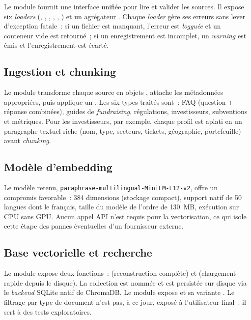 Le module  fournit une interface unifiée pour lire et valider les sources. Il expose six \textit{loaders} (, , , , , ) et un agrégateur . Chaque \textit{loader} gère ses erreurs sans lever d'exception fatale~: si un fichier est manquant, l'erreur est \textit{logguée} et un conteneur vide est retourné~; si un enregistrement est incomplet, un \textit{warning} est émis et l'enregistrement est écarté.

\subsection{Ingestion et chunking}

Le module  transforme chaque source en objets , attache les métadonnées appropriées, puis applique un . Les six types traités sont~: \ac{FAQ} (question + réponse combinées), guides de \textit{fundraising}, régulations, investisseurs, subventions et métriques. Pour les investisseurs, par exemple, chaque profil est aplati en un paragraphe textuel riche (nom, type, secteurs, tickets, géographie, portefeuille) avant \textit{chunking}.

\subsection{Modèle d'embedding}

Le modèle retenu, \texttt{paraphrase-multilingual-MiniLM-L12-v2}, offre un compromis favorable~: 384 dimensions (stockage compact), support natif de 50 langues dont le français, taille du modèle de l'ordre de 130~MB, exécution sur \ac{CPU} sans \ac{GPU}. Aucun appel \ac{API} n'est requis pour la vectorisation, ce qui isole cette étape des pannes éventuelles d'un fournisseur externe.

\subsection{Base vectorielle et recherche}

Le module  expose deux fonctions~:  (reconstruction complète) et  (chargement rapide depuis le disque). La collection est nommée  et est persistée sur disque via le \textit{backend} SQLite natif de ChromaDB. Le module  expose  et sa variante . Le filtrage par type de document n'est pas, à ce jour, exposé à l'utilisateur final~: il sert à des tests exploratoires.

